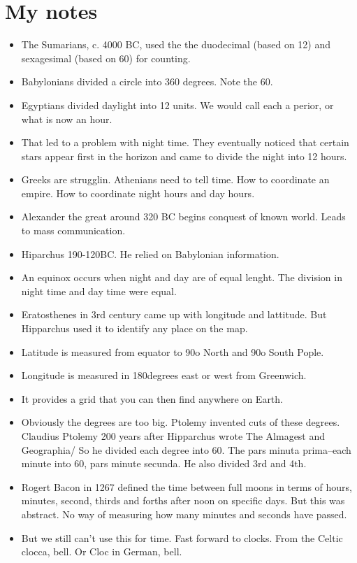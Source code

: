 \documentclass[11pt]{article}
\begin{document}
\section{My notes}
\begin{itemize}
\item The Sumarians, c. 4000 BC, used the the duodecimal (based on 12) and sexagesimal (based on 60) for counting.
\item Babylonians divided a circle into 360 degrees. Note the 60.  
\item Egyptians divided daylight into 12 units. We would call each a perior, or what is now an hour.
\item That led to a problem with night time. They eventually noticed that certain stars appear first in the horizon and came to divide the night into 12 hours. 
\item Greeks are strugglin. Athenians need to tell time. How to coordinate an empire. How to coordinate night hours and day hours.
\item Alexander the great around 320 BC begins conquest of known world. Leads to mass communication.
\item Hiparchus 190-120BC. He relied on Babylonian information.
\item An equinox occurs when night and day are of equal lenght. The division in night time and day time were equal.
\item Eratosthenes in 3rd century came up with longitude and lattitude. But Hipparchus used it to identify any place on the map.
\item Latitude is measured from equator to 90o North and 90o South Pople. 
\item Longitude is measured in 180degrees east or west from Greenwich. 
\item It provides a grid that you can then find anywhere on Earth. 
\item Obviously the degrees are too big. Ptolemy invented cuts of these degrees.  Claudius Ptolemy 200 years after Hipparchus wrote The Almagest and Geographia/ So he divided each degree into 60. The  pars minuta prima--each minute into 60, pars minute secunda. He also divided 3rd and 4th. 
\item Rogert Bacon in 1267 defined the time between full moons in terms of hours, minutes, second, thirds and forths after noon on specific days. But this was abstract. No way of measuring how many minutes and seconds have passed.
\item But we still can't use this for time. Fast forward to clocks. From the Celtic clocca, bell. Or Cloc in German, bell. 

\end{itemize}
\end{document}
